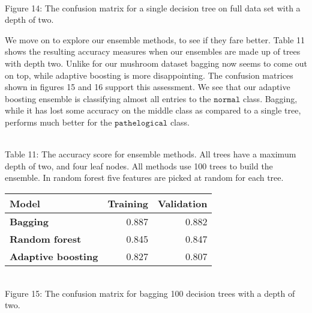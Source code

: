 \documentclass[11pt]{article}
\begin{document}
 \begin{center}
 \end{center}
 { \hspace*{\fill} \\}
 Figure 14: The confusion matrix for a single decision tree on full data set with a depth of two.

We move on to explore our ensemble methods, to see if they fare better. Table 11 shows the resulting accuracy measures when our ensembles are made up of trees with depth two. Unlike for our mushroom dataset bagging now seems to come out on top, while adaptive boosting is more disappointing. The confusion matrices shown in figures 15 and 16 support this assessment. We see that our adaptive boosting ensemble is classifying almost all entries to the $\texttt{normal}$ class. Bagging, while it has lost some accuracy on the middle class as compared to a single tree, performs much better for the $\texttt{pathelogical}$ class. 

{ \hspace*{\fill} \\}
Table 11: The accuracy score for ensemble methods. All trees have a maximum depth of two, and four leaf nodes. All methods use 100 trees to build the ensemble. In random forest five features are picked at random for each tree.
\begin{table}[h!]
	\begin{center}
		\label{tab:table1}
		\begin{tabular}{l|r|r}
			\textbf{Model}                                                 	& \textbf{Training} & \textbf{Validation}
			\\ \hline
			\textbf{Bagging}                             		             & 0.887        & 0.882              \\ \hline
			\textbf{Random forest}                                		     & 0.845        & 0.847              \\ \hline
			\textbf{Adaptive boosting}   							    	 & 0.827        & 0.807                \\ \hline
		\end{tabular}
	\end{center}
\end{table}
  \begin{center}
 \end{center}
 { \hspace*{\fill} \\}
 Figure 15: The confusion matrix for bagging 100 decision trees with a depth of two.
 
\end{document}

